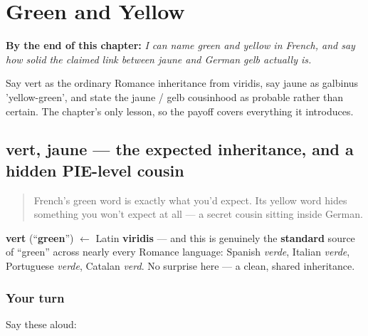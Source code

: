 
\chapter{Green and Yellow}
\label{ch:fr-green-and-yellow}

\begin{chapteropening}
\textbf{By the end of this chapter:} \emph{I can name green and yellow in French, and say how solid the claimed link between jaune and German gelb actually is.}

Say vert as the ordinary Romance inheritance from viridis, say jaune as galbinus 'yellow-green', and state the jaune / gelb cousinhood as probable rather than certain. The chapter's only lesson, so the payoff covers everything it introduces.
\end{chapteropening}

\section[vert, jaune]{vert, jaune — the expected inheritance, and a hidden PIE-level cousin}

\label{lesson:FR-C23-vert-jaune}



\begin{quote}
French's green word is exactly what you'd expect. Its yellow word hides something you won't expect at all — a secret cousin sitting inside German.
\end{quote}

\begin{cousinweb}
\textbf{vert} (\textquotedblleft{}\textbf{green}\textquotedblright{}) $\leftarrow$ Latin \textbf{viridis} — and this is genuinely the \textbf{standard} source of \textquotedblleft{}green\textquotedblright{} across nearly every Romance language: Spanish \emph{verde}, Italian \emph{verde}, Portuguese \emph{verde}, Catalan \emph{verd}. No surprise here — a clean, shared inheritance.
\end{cousinweb}

\subsection*{Your turn}
Say these aloud:

